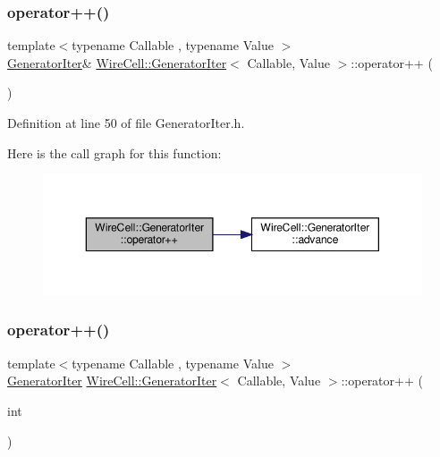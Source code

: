\subsubsection{\texorpdfstring{operator++()}{operator++()}\hspace{0.1cm}{\footnotesize\ttfamily [1/2]}}
{\footnotesize\ttfamily template$<$typename Callable , typename Value $>$ \\
\hyperlink{struct_wire_cell_1_1_generator_iter}{Generator\+Iter}\& \hyperlink{struct_wire_cell_1_1_generator_iter}{Wire\+Cell\+::\+Generator\+Iter}$<$ Callable, Value $>$\+::operator++ (\begin{DoxyParamCaption}{ }\end{DoxyParamCaption})\hspace{0.3cm}{\ttfamily [inline]}}



Definition at line 50 of file Generator\+Iter.\+h.

Here is the call graph for this function\+:
\nopagebreak
\begin{figure}[H]
\begin{center}
\leavevmode
\includegraphics[width=350pt]{struct_wire_cell_1_1_generator_iter_afdbd700ee6f8d0e518b39ec585de2af8_cgraph}
\end{center}
\end{figure}
\mbox{\label{struct_wire_cell_1_1_generator_iter_a017176bffd48d6849a86840c21a0d97e}} 
\subsubsection{\texorpdfstring{operator++()}{operator++()}\hspace{0.1cm}{\footnotesize\ttfamily [2/2]}}
{\footnotesize\ttfamily template$<$typename Callable , typename Value $>$ \\
\hyperlink{struct_wire_cell_1_1_generator_iter}{Generator\+Iter} \hyperlink{struct_wire_cell_1_1_generator_iter}{Wire\+Cell\+::\+Generator\+Iter}$<$ Callable, Value $>$\+::operator++ (\begin{DoxyParamCaption}\item[{int}]{ }\end{DoxyParamCaption})\hspace{0.3cm}{\ttfamily [inline]}}



